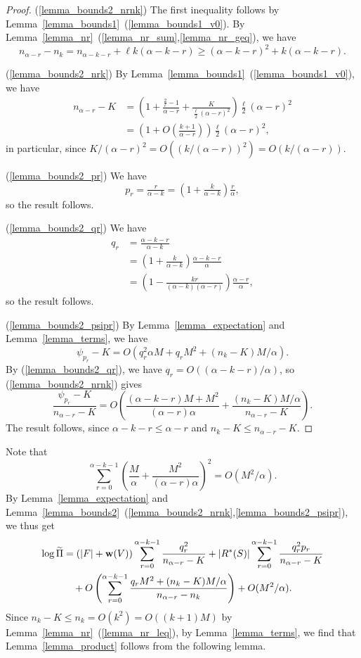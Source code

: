 \documentclass{article}
\theoremstyle{plain}
\theoremstyle{remark}
\theoremstyle{plain}
\numberwithin{equation}{section}
\renewcommand{\b}{{\bf{w}}}
\begin{document}
	\begin{proof}
		(\ref{lemma_bounds2_nrnk}) The first inequality follows by Lemma~\ref{lemma_bounds1}~(\ref{lemma_bounds1_v0}).  By Lemma~\ref{lemma_nr}~(\ref{lemma_nr_sum},\ref{lemma_nr_geq}), we have $$n_{\alpha-r}-n_k=n_{\alpha-k-r}+\ell k(\alpha-k-r)\geq(\alpha-k-r)^2+k(\alpha-k-r).$$
		
		(\ref{lemma_bounds2_nrk}) By Lemma~\ref{lemma_bounds1}~(\ref{lemma_bounds1_v0}), we have
		\begin{align}
			n_{\alpha-r}-K
			&=\left(1+\frac{\frac{2}{\ell}-1}{\alpha-r}+\frac{K}{\frac{\ell}{2}(\alpha-r)^2}\right)\tfrac{\ell}{2}(\alpha-r)^2
			\\&=\left(1+O\left(\frac{k+1}{\alpha-r}\right)\right)\tfrac{\ell}{2}(\alpha-r)^2,
		\end{align}
		in particular, since $K/(\alpha-r)^2=O((k/(\alpha-r))^2)=O(k/(\alpha-r))$.
		
		(\ref{lemma_bounds2_pr}) We have $$p_r=\tfrac{r}{\alpha-k}=(1+\tfrac{k}{\alpha-k})\tfrac{r}{\alpha},$$ so the result follows.
		
		(\ref{lemma_bounds2_qr}) We have
		\begin{align}
			q_r&=\tfrac{\alpha-k-r}{\alpha-k}
			\\&=(1+\tfrac{k}{\alpha-k})\tfrac{\alpha-k-r}{\alpha}
			\\&=(1-\tfrac{kr}{(\alpha-k)(\alpha-r)})\tfrac{\alpha-r}{\alpha},
		\end{align}
		so the result follows.
		
		(\ref{lemma_bounds2_psipr}) By Lemma~\ref{lemma_expectation} and Lemma~\ref{lemma_terms}, we have $$\psi_{p_r}-K=O(q_r^2\alpha M+q_rM^2+(n_k-K)M/\alpha).$$ By (\ref{lemma_bounds2_qr}), we have $q_r=O((\alpha-k-r)/\alpha)$, so (\ref{lemma_bounds2_nrnk}) gives $$\frac{\psi_{p_r}-K}{n_{\alpha-r}-K}=O\left(\frac{(\alpha-k-r)M+M^2}{(\alpha-r)\alpha}+\frac{(n_k-K)M/\alpha}{n_{\alpha-r}-K}\right).$$ The result follows, since $\alpha-k-r\leq\alpha-r$ and $n_k-K\leq n_{\alpha-r}-K$.
	\end{proof}
	
	Note that $$\sum_{r=0}^{\alpha-k-1}\left(\frac{M}{\alpha}+\frac{M^2}{(\alpha-r)\alpha}\right)^2=O(M^2/\alpha).$$ By Lemma~\ref{lemma_expectation} and Lemma~\ref{lemma_bounds2}~(\ref{lemma_bounds2_nrnk},\ref{lemma_bounds2_psipr}), we thus get
	\begin{align}
		\log\widetilde\Pi&=(|F|+\b(V))\sum_{r=0}^{\alpha-k-1}\frac{q_r^2}{n_{\alpha-r}-K}+|R^*(S)|\sum_{r=0}^{\alpha-k-1}\frac{q_r^2p_r}{n_{\alpha-r}-K}
		\\&\quad+O\left(\sum_{r=0}^{\alpha-k-1}\frac{q_rM^2+(n_k-K)M/\alpha}{n_{\alpha-r}-n_k}\right)+O(M^2/\alpha).
	\end{align}
	Since $n_k-K\leq n_k=O(k^2)=O((k+1)M)$ by Lemma~\ref{lemma_nr}~(\ref{lemma_nr_leq}), by Lemma~\ref{lemma_terms}, we find that Lemma~\ref{lemma_product} follows from the following lemma.
	
\end{document}
